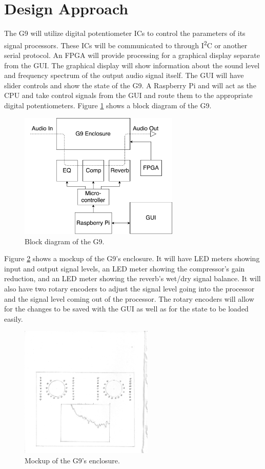 \documentclass[journal]{IEEEtran}
\begin{document}
	
	\section{Design Approach}
	The G9 will utilize digital potentiometer ICs to control the parameters of its signal processors.  These ICs will be communicated to through I\textsuperscript{2}C or another serial protocol. An FPGA will provide processing for a graphical display separate from the GUI. The graphical display will show information about the sound level and frequency spectrum of the output audio signal itself. The GUI will have slider controls and show the state of the G9. A Raspberry Pi and will act as the CPU and take control signals from the GUI and route them to the appropriate digital potentiometers. Figure \ref{fig:blockDiagram} shows a block diagram of the G9.
	
	\begin{figure}
		\centering
		\includegraphics[width=3in]{blockDiagram}
		\caption{Block diagram of the G9. }
		\label{fig:blockDiagram}
	\end{figure}
	
	Figure \ref{fig:g9Enclosure} shows a mockup of the G9's enclosure. It will have LED meters showing input and output signal levels, an LED meter showing the compressor's gain reduction, and an LED meter showing the reverb's wet/dry signal balance. It will also have two rotary encoders to adjust the signal level going into the processor and the signal level coming out of the processor. The rotary encoders will allow for the changes to be saved with the GUI as well as for the state to be loaded easily.
	\begin{figure}
		\centering
		\includegraphics[width=2.5in]{g9Enclosure}
		\caption{Mockup of the G9's enclosure. }
		\label{fig:g9Enclosure}
	\end{figure}
	
\end{document}

